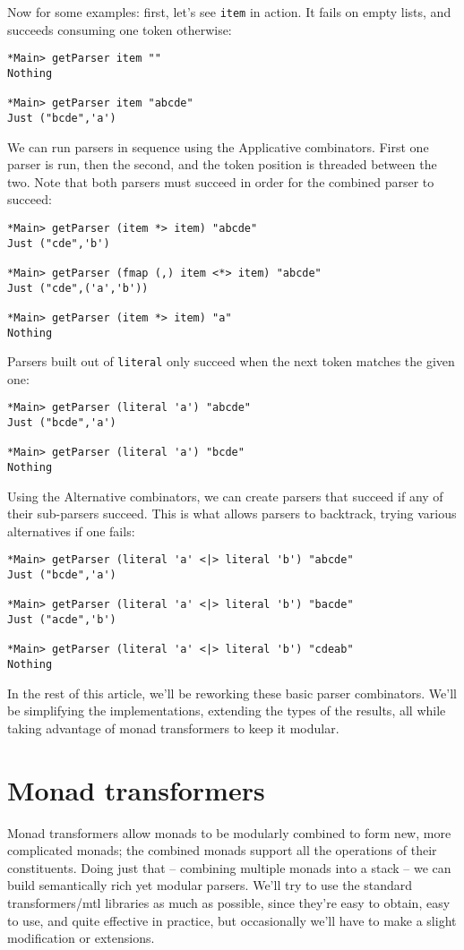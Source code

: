 \documentclass{tmr}
\begin{document}
Now for some examples:  first, let's see \verb+item+ in action.  It fails on empty lists,
and succeeds consuming one token otherwise:
\begin{verbatim}
*Main> getParser item ""
Nothing

*Main> getParser item "abcde"
Just ("bcde",'a')
\end{verbatim}

We can run parsers in sequence using the Applicative combinators.  First one parser
is run, then the second, and the token position is threaded between the two.
Note that both parsers must succeed in order for the combined parser to succeed:
\begin{verbatim}
*Main> getParser (item *> item) "abcde"
Just ("cde",'b')

*Main> getParser (fmap (,) item <*> item) "abcde"
Just ("cde",('a','b'))

*Main> getParser (item *> item) "a"
Nothing
\end{verbatim}

Parsers built out of \verb+literal+ only succeed when the next token matches 
the given one:
\begin{verbatim}
*Main> getParser (literal 'a') "abcde"
Just ("bcde",'a')

*Main> getParser (literal 'a') "bcde"
Nothing
\end{verbatim}

Using the Alternative combinators, we can create parsers that succeed if any of
their sub-parsers succeed.  This is what allows parsers to backtrack, trying
various alternatives if one fails:
\begin{verbatim}
*Main> getParser (literal 'a' <|> literal 'b') "abcde"
Just ("bcde",'a')

*Main> getParser (literal 'a' <|> literal 'b') "bacde"
Just ("acde",'b')

*Main> getParser (literal 'a' <|> literal 'b') "cdeab"
Nothing
\end{verbatim}
In the rest of this article, we'll be reworking these basic parser combinators.
We'll be simplifying the implementations, extending the types of the results,
all while taking advantage of monad transformers to keep it modular.




\section{Monad transformers}
Monad transformers \cite{liang} allow monads to be modularly combined to form 
new, more complicated monads; the combined monads support all the operations of
their constituents.  Doing just that -- combining multiple monads into a stack --
we can build semantically rich yet modular parsers.
We'll try to use the standard transformers/mtl \cite{mtl} libraries as much as possible, 
since they're easy to obtain, easy to use, and quite effective in practice, but
occasionally we'll have to make a slight modification or extensions.
\end{document}
